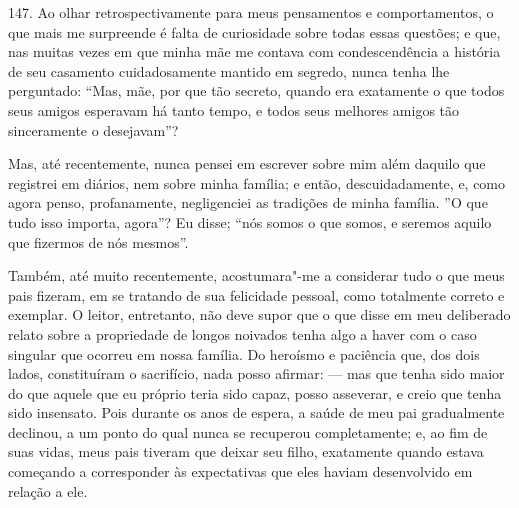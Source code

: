 147. Ao olhar retrospectivamente para meus pensamentos e comportamentos,
o que mais me surpreende é falta de curiosidade sobre todas essas
questões; e que, nas muitas vezes em que minha mãe me contava com
condescendência a história de seu casamento cuidadosamente mantido em
segredo, nunca tenha lhe perguntado: ``Mas, mãe, por que tão secreto,
quando era exatamente o que todos seus amigos esperavam há tanto tempo,
e todos seus melhores amigos tão sinceramente o desejavam''?

Mas, até recentemente, nunca pensei em escrever sobre mim além daquilo
que registrei em diários, nem sobre minha família; e então,
descuidadamente, e, como agora penso, profanamente, negligenciei as
tradições de minha família. ''O que tudo isso importa, agora''? Eu
disse; ``nós somos o que somos, e seremos aquilo que fizermos de nós
mesmos''.

Também, até muito recentemente, acostumara"-me a considerar tudo o que
meus pais fizeram, em se tratando de sua felicidade pessoal, como
totalmente correto e exemplar. O leitor, entretanto, não deve supor que
o que disse em meu deliberado relato sobre a propriedade de longos
noivados tenha algo a haver com o caso singular que ocorreu em nossa
família. Do heroísmo e paciência que, dos dois lados, constituíram o
sacrifício, nada posso afirmar: --- mas que tenha sido maior do que
aquele que eu próprio teria sido capaz, posso asseverar, e creio que
tenha sido insensato. Pois durante os anos de espera, a saúde de meu pai
gradualmente declinou, a um ponto do qual nunca se recuperou
completamente; e, ao fim de suas vidas, meus pais tiveram que deixar seu
filho, exatamente quando estava começando a corresponder às expectativas
que eles haviam desenvolvido em relação a ele.


